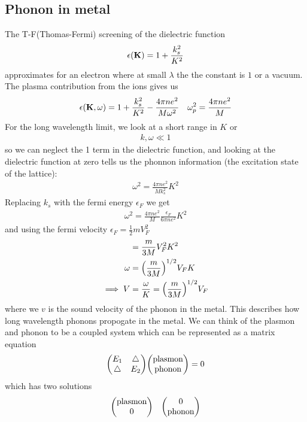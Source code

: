 \documentclass[../main.tex]{subfiles}
\begin{document}
\newpage
{}
\subsection*{Phonon in metal}
The T-F(Thomas-Fermi) screening of the dielectric function
\begin{align*}
    \epsilon(\vb K) = 1 + \frac{k_s^2}{K^2}
\end{align*}
approximates for an electron where at small $\lambda$ the the constant is $1$ or a vacuum. The 
plasma contribution from the ions gives us
\begin{align*}
    \epsilon(\vb K, \omega) = 1 + \frac{k_s^2}{K^2} - \frac{4\pi n e^2}{M\omega^2} \quad \omega_p^2 = \frac{4\pi n e^2}{M}
\end{align*}
For the long wavelength limit, we look at a short range in $K$ or
\begin{align*}
    k, \omega \ll 1
\end{align*}
so we can neglect the 1 term in the dielectric function, and looking at the dielectric function at
zero tells us the phonnon information (the excitation state of the lattice):
\begin{align*}
    \omega^2 = \frac{4\pi n e^2}{M k_s^2} K^2
\end{align*}
Replacing $k_s$ with the fermi energy $\epsilon_F$ we get 
\begin{align*}
    \omega^2 = \frac{4\pi n e^2}{M} \frac{\epsilon_F}{6\pi n e^2} K^2
\end{align*}
and using the fermi velocity $\epsilon_F = \frac{1}{2} m V_F^2$ 
\begin{align*}
    &= \frac{m}{3M} V_F^2 K^2 \\
    \omega &= \qt(\frac{m}{3M})^{1/2} V_F K \\
    \implies V &= \frac{\omega}{K} = \qt(\frac{m}{3M})^{1/2} V_F 
\end{align*}
where we $v$ is the sound velocity of the phonon in the metal. This describes how long wavelength 
phonons propogate in the metal. We can think of the plasmon and phonon to be a coupled system which
can be represented as a matrix equation
\begin{align*}
    \mqty(E_1 & \triangle \\ \triangle & E_2) \mqty(\text{plasmon} \\ \text{phonon}) = 0
\end{align*}
which has two solutions
\begin{align*}
    \mqty(\text{plasmon} \\ 0 ) \quad \mqty(0 \\ \text{phonon})
\end{align*}
\end{document}
